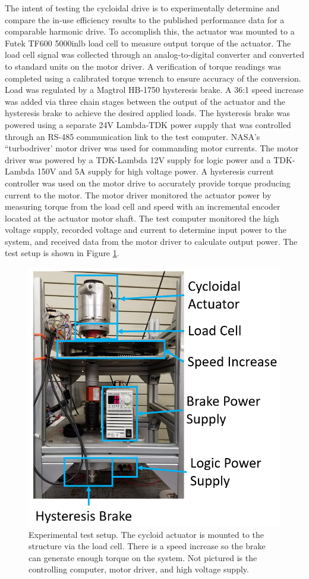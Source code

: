 The intent of testing the cycloidal drive is to experimentally determine and compare the in-use efficiency results to the published performance data for a comparable harmonic drive.
To accomplish this, the actuator was mounted to a Futek TF600 5000inlb load cell to measure output torque of the actuator.
The load cell signal was collected through an analog-to-digital converter and converted to standard units on the motor driver.
A verification of torque readings was completed using a calibrated torque wrench to ensure accuracy of the conversion.
Load was regulated by a Magtrol HB-1750 hysteresis brake.
A 36:1 speed increase was added via three chain stages between the output of the actuator and the hysteresis brake to achieve the desired applied loads.
The hysteresis brake was powered using a separate 24V Lambda-TDK power supply that was controlled through an RS-485 communication link to the test computer.
NASA's ``turbodriver' motor driver was used for commanding motor currents.
The motor driver was powered by a TDK-Lambda 12V supply for logic power and a TDK-Lambda 150V and 5A supply for high voltage power.
A hysteresis current controller was used on the motor drive to accurately provide torque producing current to the motor.
The motor driver monitored the actuator power by measuring torque from the load cell and speed with an incremental encoder located at the actuator motor shaft.
The test computer monitored the high voltage supply, recorded voltage and current to determine input power to the system, and received data from the motor driver to calculate output power.
The test setup is shown in Figure \ref{fig:test_setup}.

\begin{figure}[t]
   \centering
   \includegraphics[width=0.75\linewidth]{fig/test_stand}
   \caption{Experimental test setup.
   The cycloid actuator is mounted to the structure via the load cell.
   There is a speed increase so the brake can generate enough torque on the system.
   Not pictured is the controlling computer, motor driver, and high voltage supply.}
   \label{fig:test_setup}
\end{figure}

